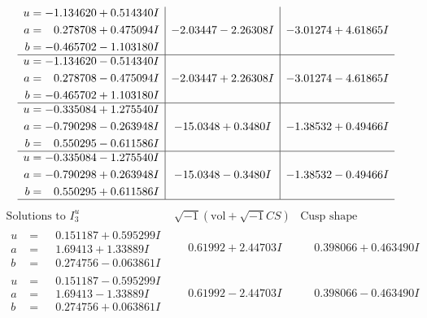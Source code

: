 \documentclass[1p]{elsarticle_modified}
\theoremstyle{definition}
\newcommand{\I}{\sqrt{-1}}
\begin{document}
$$\begin{array}{c|c|c}
\begin{aligned}
u &= -1.134620 + 0.514340 I \\
a &= \phantom{-}0.278708 + 0.475094 I \\
b &= -0.465702 - 1.103180 I\end{aligned}
 & -2.03447 - 2.26308 I & -3.01274 + 4.61865 I \\ \hline\begin{aligned}
u &= -1.134620 - 0.514340 I \\
a &= \phantom{-}0.278708 - 0.475094 I \\
b &= -0.465702 + 1.103180 I\end{aligned}
 & -2.03447 + 2.26308 I & -3.01274 - 4.61865 I \\ \hline\begin{aligned}
u &= -0.335084 + 1.275540 I \\
a &= -0.790298 - 0.263948 I \\
b &= \phantom{-}0.550295 - 0.611586 I\end{aligned}
 & -15.0348 + 0.3480 I & -1.38532 + 0.49466 I \\ \hline\begin{aligned}
u &= -0.335084 - 1.275540 I \\
a &= -0.790298 + 0.263948 I \\
b &= \phantom{-}0.550295 + 0.611586 I\end{aligned}
 & -15.0348 - 0.3480 I & -1.38532 - 0.49466 I\\
 \hline 
 \end{array}$$\newpage$$\begin{array}{c|c|c}  
\text{Solutions to }I^u_{3}& \I (\text{vol} + \sqrt{-1}CS) & \text{Cusp shape}\\
 \hline 
\begin{aligned}
u &= \phantom{-}0.151187 + 0.595299 I \\
a &= \phantom{-}1.69413 + 1.33889 I \\
b &= \phantom{-}0.274756 - 0.063861 I\end{aligned}
 & \phantom{-}0.61992 + 2.44703 I & \phantom{-}0.398066 + 0.463490 I \\ \hline\begin{aligned}
u &= \phantom{-}0.151187 - 0.595299 I \\
a &= \phantom{-}1.69413 - 1.33889 I \\
b &= \phantom{-}0.274756 + 0.063861 I\end{aligned}
 & \phantom{-}0.61992 - 2.44703 I & \phantom{-}0.398066 - 0.463490 I \\ \hline\begin{aligned}

\end{aligned}
\end{array}$$
\end{document}
